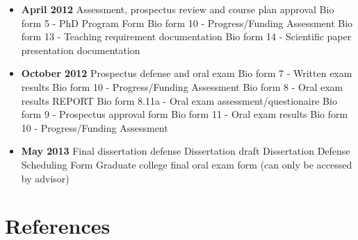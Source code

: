 \documentclass[12pt]{article}
\begin{document}
\begin{itemize}
\item \textbf{April 2012} Assessment, prospectus review and course plan approval
  \subitem Bio form 5 - PhD Program Form
  \subitem Bio form 10 - Progress/Funding Assessment
  \subitem Bio form 13 - Teaching requirement documentation
  \subitem Bio form 14 - Scientific paper presentation documentation
\item \textbf{October 2012} Prospectus defense and oral exam
  \subitem Bio form 7 - Written exam results
  \subitem Bio form 10 - Progress/Funding Assessment
  \subitem Bio form 8 - Oral exam results REPORT
  \subitem Bio form 8.11a - Oral exam assessment/questionaire
  \subitem Bio form 9 - Prospectus approval form
  \subitem Bio form 11 - Oral exam results
  \subitem Bio form 10 - Progress/Funding Assessment
\item \textbf{May 2013} Final dissertation defense
  \subitem Dissertation draft
  \subitem Dissertation Defense Scheduling Form
  \subitem Graduate college final oral exam form (can only be accessed
  by advisor)
\end{itemize}

\section{References}




\end{document}
